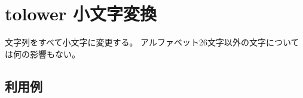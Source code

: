 
%

\section{tolower 小文字変換\label{sect:tolower}}
文字列をすべて小文字に変更する。
アルファベット26文字以外の文字については何の影響もない。

\subsection*{利用例}


%

